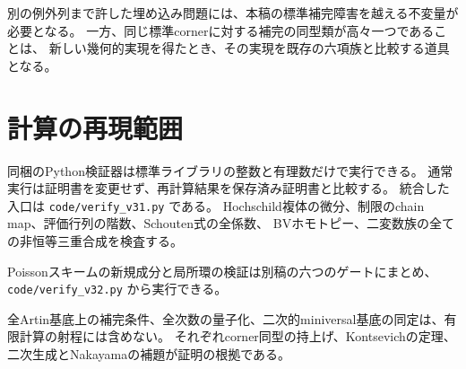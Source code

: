 別の例外列まで許した埋め込み問題には、本稿の標準補完障害を越える不変量が必要となる。
一方、同じ標準cornerに対する補完の同型類が高々一つであることは、
新しい幾何的実現を得たとき、その実現を既存の六項族と比較する道具となる。

\section{計算の再現範囲}

同梱のPython検証器は標準ライブラリの整数と有理数だけで実行できる。
通常実行は証明書を変更せず、再計算結果を保存済み証明書と比較する。
統合した入口は \texttt{code/verify\_v31.py} である。
Hochschild複体の微分、制限のchain map、評価行列の階数、Schouten式の全係数、
BVホモトピー、二変数族の全ての非恒等三重合成を検査する。

Poissonスキームの新規成分と局所環の検証は別稿の六つのゲートにまとめ、
\nolinkurl{code/verify_v32.py} から実行できる。

全Artin基底上の補完条件、全次数の量子化、二次的miniversal基底の同定は、有限計算の射程には含めない。
それぞれcorner同型の持上げ、Kontsevichの定理、二次生成とNakayamaの補題が証明の根拠である。
